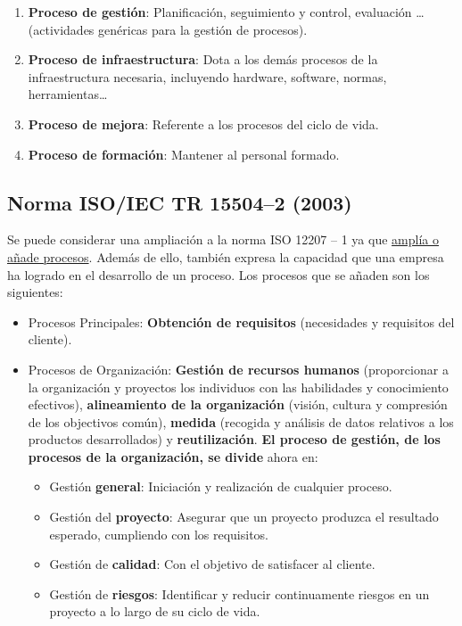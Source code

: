 \begin{enumerate}
    \item \textbf{Proceso de gestión}: Planificación, seguimiento y control, evaluación \ldots (actividades genéricas para la gestión de procesos).
    \item \textbf{Proceso de infraestructura}: Dota a los demás procesos de la infraestructura necesaria, incluyendo hardware, software, normas, herramientas\ldots
    \item \textbf{Proceso de mejora}: Referente a los procesos del ciclo de vida.
    \item \textbf{Proceso de formación}: Mantener al personal formado.
\end{enumerate}

\subsection{Norma ISO/IEC TR 15504--2 (2003)}
Se puede considerar una ampliación a la norma ISO 12207 – 1 ya que \uline{amplía o añade procesos}. Además de ello, también expresa la capacidad que una empresa ha logrado en el desarrollo de un proceso. Los procesos que se añaden son los siguientes:

\begin{itemize}
    \item Procesos Principales: \textbf{Obtención de requisitos} (necesidades y requisitos del cliente).
    \item Procesos de Organización: \textbf{Gestión de recursos humanos} (proporcionar a la organización y proyectos los individuos con las habilidades y conocimiento efectivos), \textbf{alineamiento de la organización} (visión, cultura y compresión de los objectivos común), \textbf{medida} (recogida y análisis de datos relativos a los productos desarrollados) y \textbf{reutilización}. \textbf{El proceso de gestión, de los procesos de la organización, se divide} ahora en:
          \begin{itemize}
              \item Gestión \textbf{general}: Iniciación y realización de cualquier proceso.
              \item Gestión del \textbf{proyecto}: Asegurar que un proyecto produzca el resultado esperado, cumpliendo con los requisitos.
              \item Gestión de \textbf{calidad}: Con el objetivo de satisfacer al cliente.
              \item Gestión de \textbf{riesgos}: Identificar y reducir continuamente riesgos en un proyecto a lo largo de su ciclo de vida.
          \end{itemize}
\end{itemize}


